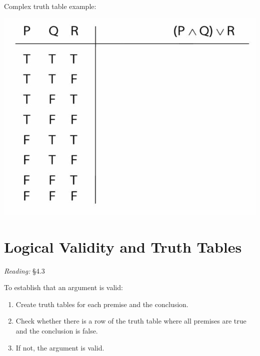 \documentclass[12pt]{extarticle}
\begin{document}
\begin{multicols*}{3}
\begin{minipage}{\columnwidth}
Complex truth table example:
 
\begin{center}
\includegraphics[scale=0.3]{img/tt_p_and_q_or_r.png}
\end{center}
\end{minipage}
 
 
 
\section{Logical Validity and Truth Tables}
 
\emph{Reading:} §4.3
 

 
\begin{minipage}{\columnwidth}
 
To establish that an argument is valid:
 
\begin{enumerate}
 
\item Create truth tables for each premise and the conclusion.
 
\item Check whether there is a row of the truth table where all premises are true and the conclusion is false.
 
\item If not, the argument is valid.
 
\end{enumerate}
 
\end{minipage}
 

\end{multicols*}
\end{document}

